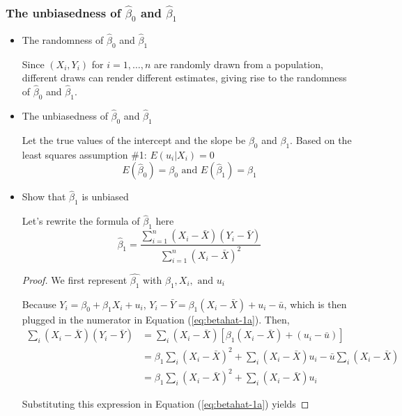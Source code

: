\documentclass[a4paper,11pt]{article}
\begin{document}
\subsubsection*{The unbiasedness of \(\hat{\beta}_0\) and \(\hat{\beta}_1\)}
\label{sec:orgec25f8e}
\begin{itemize}
\item The randomness of \(\hat{\beta}_0\) and \(\hat{\beta}_1\)

Since \((X_i, Y_i)\) for \(i = 1, \ldots, n\) are randomly drawn from a
population, different draws can render different estimates, giving
rise to the randomness of \(\hat{\beta}_0\) and \(\hat{\beta}_1\).

\item The unbiasedness of \(\hat{\beta}_0\) and \(\hat{\beta}_1\)

Let the true values of the intercept and the slope be \(\beta_0\) and \(\beta_1\). Based on the least squares assumption \#1: \(E(u_i|X_i) = 0\)
\[ E(\hat{\beta}_0) = \beta_0 \text{ and } E(\hat{\beta}_1) =
  \beta_1 \]

\item Show that \(\hat{\beta}_1\) is unbiased

Let's rewrite the formula of \(\hat{\beta}_1\) here
\begin{equation}
\label{eq:betahat-1a}
\hat{\beta}_1  = \frac{\sum_{i=1}^n (X_i - \bar{X})(Y_i - \bar{Y})}{\sum_{i=1}^n (X_i - \bar{X})^2}
\end{equation}

\begin{proof}
We first represent $\hat{\beta_1}$ with $\beta_1, X_i, \text{ and } u_i$

Because $Y_i = \beta_0 + \beta_1 X_i + u_i$, $Y_i - \bar{Y} =
\beta_1 (X_i - \bar{X}) + u_i - \bar{u}$, which is then plugged in
the numerator in Equation (\ref{eq:betahat-1a}). Then,
\begin{equation*}
\begin{split}
\sum_i (X_i - \bar{X})(Y_i - \bar{Y}) &= \sum_i (X_i - \bar{X})\left[\beta_1(X_i - \bar{X}) + (u_i - \bar{u}) \right] \\
&= \beta_1 \sum_i(X_i - \bar{X})^2 + \sum_i (X_i - \bar{X})u_i - \bar{u}\sum_i (X_i - \bar{X}) \\
&= \beta_1 \sum_i(X_i - \bar{X})^2 + \sum_i (X_i - \bar{X})u_i
\end{split}
\end{equation*}

Substituting this expression in Equation (\ref{eq:betahat-1a}) yields


\end{proof}
\end{itemize}
\end{document}
